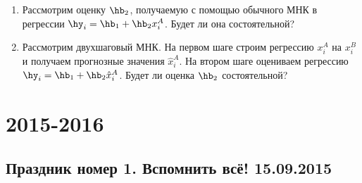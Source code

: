 \documentclass[12pt, a4paper]{article}
\theoremstyle{definition}
\begin{document}
\begin{enumerate}
\begin{enumerate}
\item Рассмотрим оценку $\hb_2$, получаемую с помощью обычного МНК в регрессии $\hy_i=\hb_1+\hb_2 x_i^A$. Будет ли она состоятельной?
\item Рассмотрим двухшаговый МНК. На первом шаге строим регрессию $x_i^A$ на $x_i^B$ и получаем прогнозные значения $\hat{x}_i^A$. На втором шаге  оцениваем регрессию $\hy_i=\hb_1+\hb_2 \hat{x}_i^A$. Будет ли оценка $\hb_2$ состоятельной?
\end{enumerate}



\end{enumerate}

\section{2015-2016}

\subsection{Праздник номер 1. Вспомнить всё! 15.09.2015}
\end{document}
